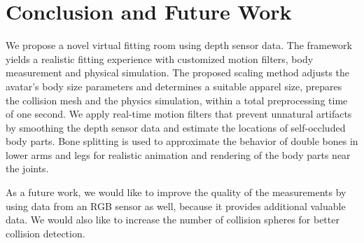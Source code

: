 \documentclass[number,preprint,review,12pt]{elsarticle}
\begin{document}
\clearpage

\section{Conclusion and Future Work}
\label{sec:Conclusions}

We propose a novel virtual fitting room using depth sensor data. The framework yields a realistic fitting experience with customized motion filters, body measurement and physical simulation. The proposed scaling method adjusts the avatar's body size parameters and determines a suitable apparel size, prepares the collision mesh and the physics simulation, within a total preprocessing time of one second. We apply real-time motion filters that prevent unnatural artifacts by smoothing the depth sensor data and estimate the locations of self-occluded body parts. Bone splitting is used to approximate the behavior of double bones in lower arms and legs for realistic animation and rendering of the body parts near the joints.

As a future work, we would like to improve the quality of the measurements by using data from an RGB sensor as well, because it provides additional valuable data. We would also like to increase the number of collision spheres for better collision detection.
 
\end{document}
